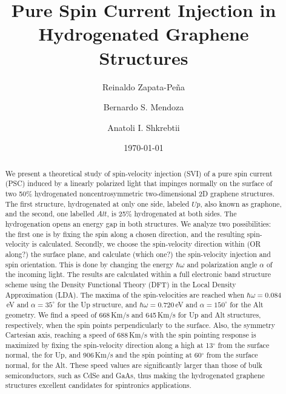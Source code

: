 \documentclass[floatfix,prb,aps,superscriptaddress,showpacs,11pt,preprint,letterpaper]{revtex4}
\begin{document}
\title{Pure Spin Current Injection in Hydrogenated Graphene Structures}
\author{Reinaldo Zapata-Pe\~na}
\author{Bernardo S. Mendoza}
\author{Anatoli I. Shkrebtii}

\date{\today}

\begin{abstract}
We present a theoretical study of spin-velocity injection (SVI) of a pure spin
current (PSC) induced by  a linearly polarized light that impinges normally on
the surface of  two 50\% hydrogenated noncentrosymmetric two-dimensional 2D
graphene structures. The first structure, hydrogenated at only one side,
labeled $Up$, also known as graphone, and the second, one labelled $Alt$, is
25\% hydrogenated at both sides. The hydrogenation opens an energy gap in both
structures. We analyze two possibilities: the first one  is by fixing the spin
along a chosen direction, and the resulting spin-velocity is calculated.
Secondly, we choose the spin-velocity direction within {\color{red}(OR along?)}
the surface plane, and calculate {\color{red}(which one?)} the spin-velocity
injection and spin orientation. This is done by changing the energy
$\hbar\omega$ and polarization angle $\alpha$  of the incoming  light. The
results are calculated within a full electronic band structure scheme using the
Density Functional Theory (DFT) in the Local Density Approximation (LDA). The
maxima of the spin-velocities are reached when $\hbar\omega=0.084$\,eV and
$\alpha=35^\circ$ for the Up structure, and $\hbar\omega=0.720$\,eV and
$\alpha=150^\circ$ for the Alt geometry. We find a speed of 668\,Km/s and
645\,Km/s for Up and Alt structures, respectively, when the spin points
perpendicularly to the surface. Also, the symmetry Cartesian axis, reaching a
speed of 688\,Km/s with the spin  pointing response is maximized by fixing the
spin-velocity direction along a high at 13$^\circ$ from the surface normal, the
for Up, and 906\,Km/s and the spin pointing at 60$^\circ$ from the surface
normal, for the Alt. These speed values are significantly larger than those of
bulk semiconductors, such as CdSe and GaAs, thus making the hydrogenated
graphene structures excellent candidates for spintronics applications.
\end{abstract}

\maketitle
\end{document}
